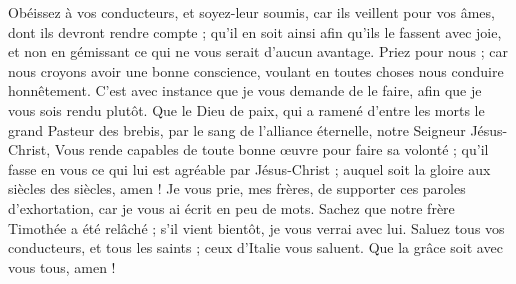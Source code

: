 \begin{multicols}{2}
Obéissez à vos conducteurs, et soyez-leur soumis, car ils veillent pour vos âmes, dont ils devront rendre compte ; qu’il en soit ainsi afin qu’ils le fassent avec joie, et non en gémissant ce qui ne vous serait d’aucun avantage.
Priez pour nous ; car nous croyons avoir une bonne conscience, voulant en toutes choses nous conduire honnêtement.
C’est avec instance que je vous demande de le faire, afin que je vous sois rendu plutôt.
Que le Dieu de paix, qui a ramené d'entre les morts le grand Pasteur des brebis, par le sang de l'alliance éternelle, notre Seigneur Jésus-Christ,
Vous rende capables de toute bonne œuvre pour faire sa volonté ; qu’il fasse en vous ce qui lui est agréable par Jésus-Christ ; auquel soit la gloire aux siècles des siècles, amen !
Je vous prie, mes frères, de supporter ces paroles d'exhortation, car je vous ai écrit en peu de mots.
Sachez que notre frère Timothée a été relâché ; s'il vient bientôt, je vous verrai avec lui.
Saluez tous vos conducteurs, et tous les saints ; ceux d'Italie vous saluent.
Que la grâce soit avec vous tous, amen !
\PPE{}
\end{multicols}
